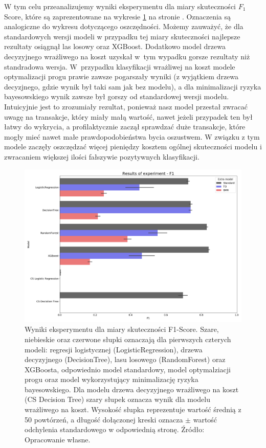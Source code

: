 \documentclass[inzynierska]{pwr_wmat_praca_dyplomowa}
\theoremstyle{plain}
\numberwithin{theorem}{chapter}
\theoremstyle{definition}
\numberwithin{theorem}{chapter}
\begin{document}
W tym celu przeanalizujemy wyniki eksperymentu dla miary skuteczności $F_1$ Score, które są zaprezentowane na wykresie \ref{fig:results-f1} na stronie \pageref{fig:results-savings}. Oznaczenia są analogiczne do wykresu dotyczącego oszczędności. Możemy zauważyć, że dla standardowych wersji modeli w przypadku tej miary skuteczności najlepsze rezultaty osiągnął las losowy oraz XGBoost. Dodatkowo model drzewa decyzyjnego wrażliwego na koszt uzyskał w~tym wypadku gorsze rezultaty niż standradowa wersja. W~przypadku klasyfikacji wrażliwej na koszt modele optymalizacji progu prawie zawsze pogarszały wyniki (z wyjątkiem drzewa decyzjnego, gdzie wynik był taki sam jak bez modelu), a dla minimalizacji ryzyka bayesowskiego wynik zawsze był gorszy od standardowej wersji modelu. Intuicyjnie jest to zrozumiały rezultat, ponieważ nasz model przestał zwracać uwagę na transakcje, który miały małą wartość, nawet jeżeli przypadek ten był łatwy do wykrycia, a profilaktycznie zaczął sprawdzać duże transakcje, które mogły mieć nawet małe prawdopodobieństwa bycia oszustwem. W związku z tym modele zaczęły oszczędzać więcej pieniędzy kosztem ogólnej skuteczności modelu i zwracaniem większej ilości fałszywie pozytywnych klasyfikacji. 

\begin{figure}[h]
	\includegraphics[width=\linewidth]{images/100_config1-F1.png}
	\caption{Wyniki eksperymentu dla miary skuteczności F1-Score. Szare, niebieskie oraz czerwone słupki oznaczają dla pierwszych czterych modeli: regresji logistycznej (LogisticRegression), drzewa decyzyjnego (DecisionTree), lasu losowego (RandomForest) oraz XGBoosta, odpowiednio model standardowy, model optymalziacji progu oraz model wykorzystujący minimalizację ryzyka bayesowskiego. Dla modelu drzewa decyzyjnego wrażliwego na koszt (CS Decision Tree) szary słupek oznacza wynik dla modelu wrażliwego na koszt. Wysokość słupka reprezentuje wartość średnią z 50 powtórzeń, a długość dołączonej kreski oznacza $\pm$ wartość odchylenia standardowego w odpowiednią stronę. Źródło: Opracowanie własne.}
	\label{fig:results-f1}
\end{figure}
\end{document}
